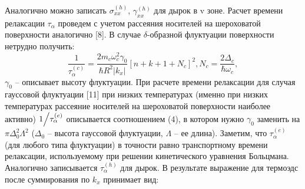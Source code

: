 Аналогично можно записать $\sigma _{xx}^{(h)} $, $\gamma _{xx}^{(h)} $ для дырок в v зоне. Расчет времени релаксации $\tau _{\alpha } $ проведем с учетом рассеяния носителей на шероховатой поверхности аналогично [8]. В случае $\delta $-образной флуктуации поверхности нетрудно получить:
\begin{equation} \label{eq:44_40}
\frac{1}{\tau _{\alpha }^{(c)} } =\frac{2m_{c} \omega _{c}^{2} \gamma _{0} }{\hbar R^{2} \left|k_{x} \right|} \left[n+k+1+N_{c} \right]^{2} , N_{c} =\frac{2\Delta _{c} }{\hbar \omega _{c} } ,
\end{equation} 
$\gamma _{0} $ -- описывает высоту флуктуации. При расчете времени релаксации для случая гауссовой флуктуации [11] при низких температурах (именно при низких температурах рассеяние носителей на шероховатой поверхности наиболее активно) ${1 \mathord{\left/{\vphantom{1 \tau _{\alpha }^{(e)} }}\right.\kern-\nulldelimiterspace} \tau _{\alpha }^{(e)} } $ описывается соотношением (4), в котором нужно $\gamma _{0} $ заменить на $\pi \Delta _{0}^{2} \Lambda ^{2} $ ($\Delta _{0} $ -- высота гауссовой флуктуации, $\Lambda $ -- ее длина). Заметим, что $\tau _{\alpha }^{(e)} $ (для любого типа флуктуации) в точности равно транспортному времени релаксации, используемому при решении кинетического уравнения Больцмана. Аналогично записывается $\tau _{\alpha }^{(h)} $ для дырок. В результате выражение для термоэдс после суммирования по $k_{x} $ принимает вид:
 
